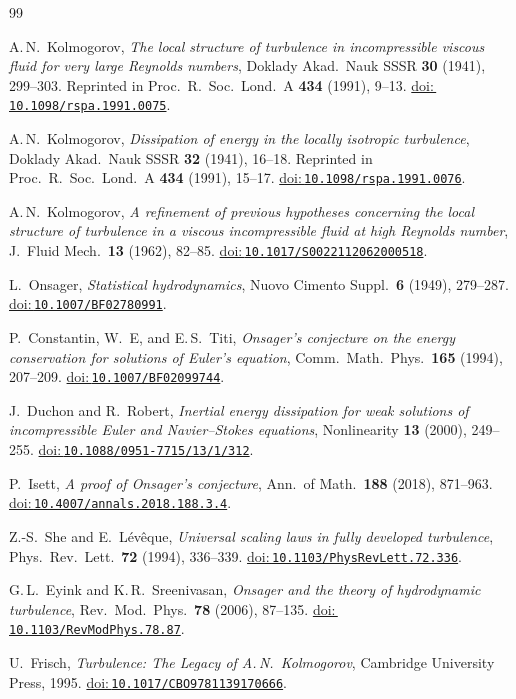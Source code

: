\documentclass[12pt,a4paper]{article}
\newcommand{\doilink}[1]{\href{https://doi.org/#1}{doi:\,\nolinkurl{#1}}}
\theoremstyle{breakdef}
\theoremstyle{breakplain}
\theoremstyle{breakdef}
\begin{document}
{}
\begin{thebibliography}{99}
\sloppy
\setlength{\emergencystretch}{3em}
\raggedright

A.\,N.~Kolmogorov,
\emph{The local structure of turbulence in incompressible viscous fluid
for very large Reynolds numbers},
Doklady Akad.\ Nauk SSSR \textbf{30} (1941), 299--303.
Reprinted in Proc.\ R.\ Soc.\ Lond.\ A \textbf{434} (1991), 9--13.
\doilink{10.1098/rspa.1991.0075}.

A.\,N.~Kolmogorov,
\emph{Dissipation of energy in the locally isotropic turbulence},
Doklady Akad.\ Nauk SSSR \textbf{32} (1941), 16--18.
Reprinted in Proc.\ R.\ Soc.\ Lond.\ A \textbf{434} (1991), 15--17.
\doilink{10.1098/rspa.1991.0076}.

A.\,N.~Kolmogorov,
\emph{A refinement of previous hypotheses concerning the local structure
of turbulence in a viscous incompressible fluid at high Reynolds number},
J.~Fluid Mech.\ \textbf{13} (1962), 82--85.
\doilink{10.1017/S0022112062000518}.

L.~Onsager,
\emph{Statistical hydrodynamics},
Nuovo Cimento Suppl.\ \textbf{6} (1949), 279--287.
\doilink{10.1007/BF02780991}.

P.~Constantin, W.~E, and E.\,S.~Titi,
\emph{Onsager's conjecture on the energy conservation for solutions of
Euler's equation},
Comm.\ Math.\ Phys.\ \textbf{165} (1994), 207--209.
\doilink{10.1007/BF02099744}.

J.~Duchon and R.~Robert,
\emph{Inertial energy dissipation for weak solutions of incompressible
Euler and Navier--Stokes equations},
Nonlinearity \textbf{13} (2000), 249--255.
\doilink{10.1088/0951-7715/13/1/312}.

P.~Isett,
\emph{A proof of Onsager's conjecture},
Ann.\ of Math.\ \textbf{188} (2018), 871--963.
\doilink{10.4007/annals.2018.188.3.4}.

Z.-S.~She and E.~Lévêque,
\emph{Universal scaling laws in fully developed turbulence},
Phys.\ Rev.\ Lett.\ \textbf{72} (1994), 336--339.
\doilink{10.1103/PhysRevLett.72.336}.

G.\,L.~Eyink and K.\,R.~Sreenivasan,
\emph{Onsager and the theory of hydrodynamic turbulence},
Rev.\ Mod.\ Phys.\ \textbf{78} (2006), 87--135.
\doilink{10.1103/RevModPhys.78.87}.

U.~Frisch,
\emph{Turbulence: The Legacy of A.\,N.\ Kolmogorov},
Cambridge University Press, 1995.
\doilink{10.1017/CBO9781139170666}.


\end{thebibliography}
\end{document}
